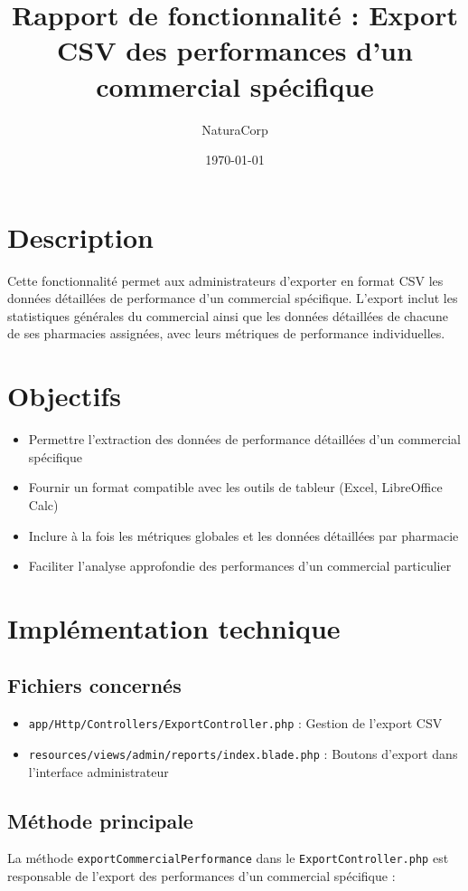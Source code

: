 \documentclass[12pt,a4paper]{article}
\title{Rapport de fonctionnalité : Export CSV des performances d'un commercial spécifique}
\author{NaturaCorp}
\date{\today}
\begin{document}
\maketitle

\section{Description}
Cette fonctionnalité permet aux administrateurs d'exporter en format CSV les données détaillées de performance d'un commercial spécifique. L'export inclut les statistiques générales du commercial ainsi que les données détaillées de chacune de ses pharmacies assignées, avec leurs métriques de performance individuelles.

\section{Objectifs}
\begin{itemize}
    \item Permettre l'extraction des données de performance détaillées d'un commercial spécifique
    \item Fournir un format compatible avec les outils de tableur (Excel, LibreOffice Calc)
    \item Inclure à la fois les métriques globales et les données détaillées par pharmacie
    \item Faciliter l'analyse approfondie des performances d'un commercial particulier
\end{itemize}

\section{Implémentation technique}

\subsection{Fichiers concernés}
\begin{itemize}
    \item \texttt{app/Http/Controllers/ExportController.php} : Gestion de l'export CSV
    \item \texttt{resources/views/admin/reports/index.blade.php} : Boutons d'export dans l'interface administrateur
\end{itemize}

\subsection{Méthode principale}
La méthode \texttt{exportCommercialPerformance} dans le \texttt{ExportController.php} est responsable de l'export des performances d'un commercial spécifique :
\end{document}
